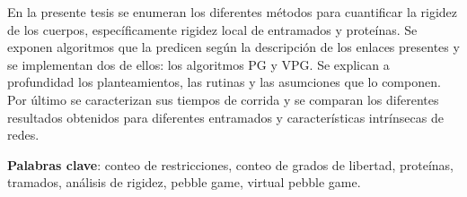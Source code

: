 En la presente tesis se enumeran los diferentes métodos para cuantificar la rigidez de los cuerpos, específicamente rigidez local de entramados y proteínas. Se exponen algoritmos que la predicen según la descripción de los enlaces presentes y se implementan dos de ellos: los algoritmos PG y VPG. Se explican a profundidad los planteamientos, las rutinas y las asumciones que lo componen. Por último se caracterizan sus tiempos de corrida y se comparan los diferentes resultados obtenidos para diferentes entramados y características intrínsecas de redes.

\textbf{Palabras clave}: conteo de restricciones, conteo de grados de libertad, proteínas, tramados, análisis de rigidez, pebble game, virtual pebble game.